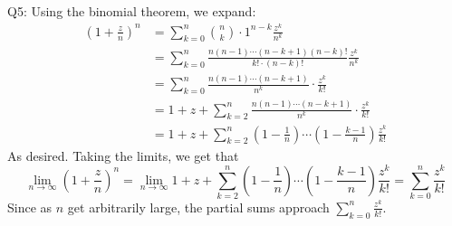 \documentclass[letterpaper]{article}
\begin{document}
\noindent
Q5: Using the binomial theorem, we expand: 
\begin{align*}
    (1+ \frac{z}{n})^n & = \sum_{k=0}^n {n \choose k} \cdot 1^{n-k} \frac{z^k}{n^k}
    \\ & = \sum_{k=0}^n \frac{n(n-1) \cdots (n-k+1)(n-k)!}{k! \cdot(n-k)!} \frac{z^k}{n^k}
    \\ & = \sum_{k=0}^n \frac{n(n-1)\cdots(n-k+1)}{n^k}\cdot \frac{z^k}{k!}
    \\ & = 1 + z + \sum_{k=2}^n \frac{n(n-1)\cdots(n-k+1)}{n^k}\cdot \frac{z^k}{k!}
    \\ & = 1+z+ \sum_{k=2}^n (1 - \frac{1}{n})\cdots ( 1 - \frac{k-1}{n}) \frac{z^k}{k!}
\end{align*}
As desired. Taking the limits, we get that $$\lim_{n \to \infty} (1+\frac{z}{n})^n = \lim_{n \to \infty} 1+z+ \sum_{k=2}^n (1 - \frac{1}{n})\cdots ( 1 - \frac{k-1}{n}) \frac{z^k}{k!} = \sum_{k=0}^n \frac{z^k}{k!}$$
Since as $n$ get arbitrarily large, the partial sums approach $\sum_{k=0}^n \frac{z^k}{k!}$. 
\end{document}
